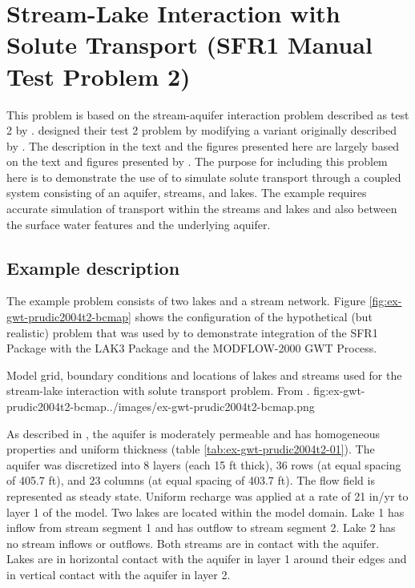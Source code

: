 \section{Stream-Lake Interaction with Solute Transport (SFR1 Manual Test Problem 2)}

This problem is based on the stream-aquifer interaction problem described as test 2 by \cite{modflowsfr1pack}.  \cite{modflowsfr1pack} designed their test 2 problem by modifying a variant originally described by \cite{modflowlak3pack}.  The description in the text and the figures presented here are largely based on the text and figures presented by \cite{modflowsfr1pack}.  The purpose for including this problem here is to demonstrate the use of \mf to simulate solute transport through a coupled system consisting of an aquifer, streams, and lakes.  The example requires accurate simulation of transport within the streams and lakes and also between the surface water features and the underlying aquifer.  

\subsection{Example description}

The example problem consists of two lakes and a stream network.  Figure \ref{fig:ex-gwt-prudic2004t2-bcmap} shows the configuration of the hypothetical (but realistic) problem that was used by \cite{modflowsfr1pack} to demonstrate integration of the SFR1 Package with the LAK3 Package and the MODFLOW-2000 GWT Process.  

\begin{StandardFigure}{
                                     Model grid, boundary conditions and locations of lakes and streams used for the stream-lake interaction with solute transport problem.  From  \cite{modflowsfr1pack}.
                                     }{fig:ex-gwt-prudic2004t2-bcmap}{../images/ex-gwt-prudic2004t2-bcmap.png}
\end{StandardFigure}            

As described in \cite{modflowsfr1pack}, the aquifer is moderately permeable and has homogeneous properties and uniform thickness (table \ref{tab:ex-gwt-prudic2004t2-01}).  The aquifer was discretized into 8 layers (each 15 ft thick), 36 rows (at equal spacing of 405.7 ft), and 23 columns (at equal spacing of 403.7 ft).  The flow field is represented as steady state.  Uniform recharge was applied at a rate of 21 in/yr to layer 1 of the model.  Two lakes are located within the model domain.  Lake 1 has inflow from stream segment 1 and has outflow to stream segment 2.  Lake 2 has no stream inflows or outflows.  Both streams are in contact with the aquifer.  Lakes are in horizontal contact with the aquifer in layer 1 around their edges and in vertical contact with the aquifer in layer 2.

